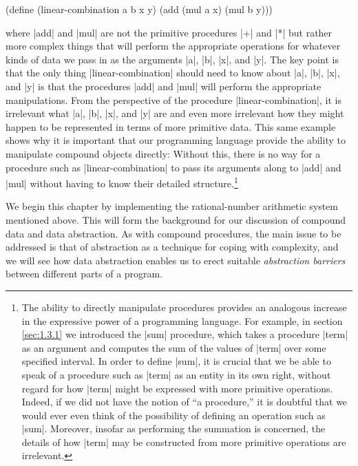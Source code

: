 \begin{schemedisplay}
(define (linear-combination a b x y)     
  (add (mul a x) (mul b y))) 
\end{schemedisplay}
where \scheme|add| and \scheme|mul| are not the primitive procedures
\scheme|+| and \scheme|*| but rather more complex things that will
perform the appropriate operations for whatever kinds of data we pass
in as the arguments \scheme|a|, \scheme|b|, \scheme|x|, and
\scheme|y|. The key point is that the only thing
\scheme|linear-combination| should need to know about \scheme|a|,
\scheme|b|, \scheme|x|, and \scheme|y| is that the procedures
\scheme|add| and \scheme|mul| will perform the appropriate
manipulations.  From the perspective of the procedure
\scheme|linear-combination|, it is irrelevant what \scheme|a|,
\scheme|b|, \scheme|x|, and \scheme|y| are and even more irrelevant
how they might happen to be represented in terms of more primitive
data.  This same example shows why it is important that our
programming language provide the ability to manipulate compound
objects directly: Without this, there is no way for a procedure such
as \scheme|linear-combination| to pass its arguments along to
\scheme|add| and \scheme|mul| without having to know their detailed
structure.\footnote{The ability to directly manipulate procedures
  provides an analogous increase in the expressive power of a
  programming language.  For example, in section \ref{sec:1.3.1} we
  introduced the \scheme|sum| procedure, which takes a procedure
  \scheme|term| as an argument and computes the sum of the values of
  \scheme|term| over some specified interval.  In order to define
  \scheme|sum|, it is crucial that we be able to speak of a procedure
  such as \scheme|term| as an entity in its own right, without regard
  for how \scheme|term| might be expressed with more primitive
  operations.  Indeed, if we did not have the notion of ``a
  procedure,'' it is doubtful that we would ever even think of the
  possibility of defining an operation such as \scheme|sum|.
  Moreover, insofar as performing the summation is concerned, the
  details of how \scheme|term| may be constructed from more primitive
  operations are irrelevant.  }

We begin this chapter by implementing the rational-number arithmetic
system mentioned above.  This will form the background for our
discussion of compound data and data abstraction.  As with compound
procedures, the main issue to be addressed is that of abstraction as a
technique for coping with complexity, and we will see how data
abstraction enables us to erect suitable \textit{abstraction barriers}
between different parts of a program.

